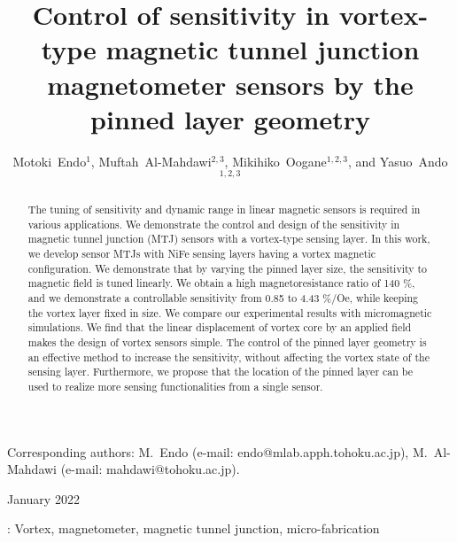 \documentclass[10pt]{iopart}
\newcommand*{\mytitle}{Control of sensitivity in vortex-type magnetic tunnel junction magnetometer sensors by the pinned layer geometry}
\newcommand*{\myshorttitle}{Control of sensitivity in vortex MTJ sensors}
\begin{document}
\title[\myshorttitle]{\mytitle}

\author{Motoki~Endo$^{1}$, Muftah~Al-Mahdawi$^{2,3}$, 
Mikihiko~Oogane$^{1,2,3}$, and Yasuo~Ando$^{1,2,3}$}

\address{$^1$ Department of Applied Physics, Tohoku University, Sendai 980-8579, Japan}
\address{$^2$ Center for Science and Innovation in Spintronics (Core Research Cluster), Tohoku University, Sendai 980-8577, Japan}
\address{$^3$ Center for Spintronics Research Network, Tohoku University, Sendai 980-8577, Japan}
\vspace{10pt}
\begin{indented}
\item[]Corresponding authors: M.~Endo (e-mail: endo@mlab.apph.tohoku.ac.jp), M.~Al-Mahdawi (e-mail: mahdawi@tohoku.ac.jp).
\item[]January 2022
\end{indented}
\begin{abstract}
   The tuning of sensitivity and dynamic range in linear magnetic sensors is required in various applications. We demonstrate the control and design of the sensitivity in magnetic tunnel junction (MTJ) sensors with a vortex-type sensing layer. In this work, we develop sensor MTJs with NiFe sensing layers having a vortex magnetic configuration. We demonstrate that by varying the pinned layer size, the sensitivity to magnetic field is tuned linearly. We obtain a high magnetoresistance ratio of 140 \%, and we demonstrate a controllable sensitivity from 0.85 to 4.43 \%/Oe, while keeping the vortex layer fixed in size. We compare our experimental results with micromagnetic simulations. We find that the linear displacement of vortex core by an applied field makes the design of vortex sensors simple. The control of the pinned layer geometry is an effective method to increase the sensitivity, without affecting the vortex state of the sensing layer. Furthermore, we propose that the location of the pinned layer can be used to realize more sensing functionalities from a single sensor.
\end{abstract}

\vspace{2pc}
: Vortex, magnetometer, magnetic tunnel junction, micro-fabrication
\submitto{\JPD}
\maketitle
\ioptwocol
\end{document}
